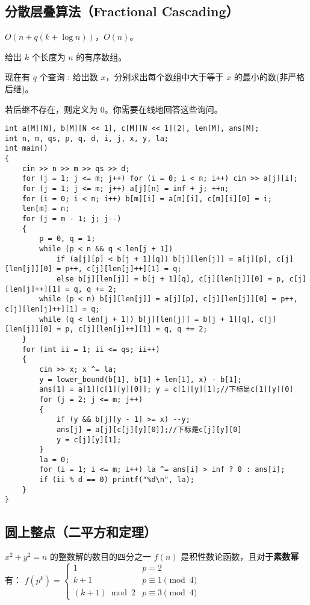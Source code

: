 \documentclass[12pt]{ctexart}
\begin{document}
\subsection{分散层叠算法（Fractional Cascading）}

$O(n+q(k+\log n))$，$O(n)$。

给出 $k$ 个长度为 $n$ 的有序数组。

现在有 $q$ 个查询 : 给出数 $x$，分别求出每个数组中大于等于 $x$ 的最小的数(非严格后继)。

若后继不存在，则定义为 $0$。你需要在线地回答这些询问。

\begin{lstlisting}
int a[M][N], b[M][N << 1], c[M][N << 1][2], len[M], ans[M];
int n, m, qs, p, q, d, i, j, x, y, la;
int main()
{
	cin >> n >> m >> qs >> d;
	for (j = 1; j <= m; j++) for (i = 0; i < n; i++) cin >> a[j][i];
	for (j = 1; j <= m; j++) a[j][n] = inf + j; ++n;
	for (i = 0; i < n; i++) b[m][i] = a[m][i], c[m][i][0] = i;
	len[m] = n;
	for (j = m - 1; j; j--)
	{
		p = 0, q = 1;
		while (p < n && q < len[j + 1])
			if (a[j][p] < b[j + 1][q]) b[j][len[j]] = a[j][p], c[j][len[j]][0] = p++, c[j][len[j]++][1] = q;
			else b[j][len[j]] = b[j + 1][q], c[j][len[j]][0] = p, c[j][len[j]++][1] = q, q += 2;
		while (p < n) b[j][len[j]] = a[j][p], c[j][len[j]][0] = p++, c[j][len[j]++][1] = q;
		while (q < len[j + 1]) b[j][len[j]] = b[j + 1][q], c[j][len[j]][0] = p, c[j][len[j]++][1] = q, q += 2;
	}
	for (int ii = 1; ii <= qs; ii++)
	{
		cin >> x; x ^= la;
		y = lower_bound(b[1], b[1] + len[1], x) - b[1];
		ans[1] = a[1][c[1][y][0]]; y = c[1][y][1];//下标是c[1][y][0]
		for (j = 2; j <= m; j++)
		{
			if (y && b[j][y - 1] >= x) --y;
			ans[j] = a[j][c[j][y][0]];//下标是c[j][y][0]
			y = c[j][y][1];
		}
		la = 0;
		for (i = 1; i <= m; i++) la ^= ans[i] > inf ? 0 : ans[i];
		if (ii % d == 0) printf("%d\n", la);
	}
}

\end{lstlisting}

\subsection{圆上整点（二平方和定理）}

$x^2+y^2=n$ 的整数解的数目的四分之一 $f(n)$ 是积性数论函数，且对于{\bf{素数幂}}有：
$f(p^k)=\begin{cases}
		1            & p=2               \\
		k+1          & p\equiv 1 \pmod 4 \\
		(k+1)\bmod 2 & p\equiv 3 \pmod 4
	\end{cases}$
\end{document}
